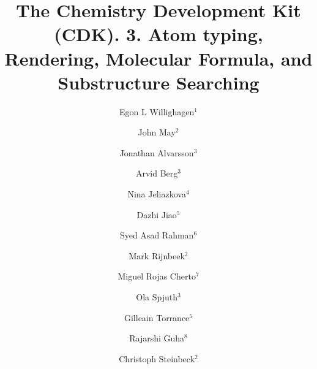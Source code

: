 \documentclass[10pt]{bmc_article}
\newenvironment{bmcformat}{\begin{raggedright}\baselineskip20pt\sloppy\setboolean{publ}{false}}{\end{raggedright}\baselineskip20pt\sloppy}
\begin{document}
\begin{bmcformat}

\title{The Chemistry Development Kit (CDK). 3. Atom typing, Rendering, Molecular Formula, and Substructure Searching}
 
\author{
  Egon L Willighagen$^{1}$%
\and
  John May$^2$%
\and
  Jonathan Alvarsson$^3$%
\and
  Arvid Berg$^3$%
\and
  Nina Jeliazkova$^4$%
\and
  Dazhi Jiao$^5$%
\and
  Syed Asad Rahman$^6$%
\and
  Mark Rijnbeek$^2$%
\and
  Miguel Rojas Cherto$^7$%
\and
  Ola Spjuth$^3$%
\and
  Gilleain Torrance$^5$%
\and
  Rajarshi Guha$^{8}$%
\and
  Christoph Steinbeck$^{2}$%
}
     
\address{
    \iid(1)Department of Bioinformatics - BiGCaT, Maastricht University, Maastricht, NL-6200 MD, The Netherlands \\
    \iid(2)Chemoinformatics and Metabolism team, European Bioinformatics Institute, Hinxton, UK, \\
    \iid(3)Department of Pharmaceutical Biosciences, Uppsala University, 751 24 Uppsala, Sweden \\
    \iid(4)Ideaconsult Ltd, A. Kanchev 4, Sofia 1000, Bulgaria \\
    \iid(5)Example Ltd., Glasgow, UK \\
    \iid(6)Example Ltd., Glasgow, UK \\
    \iid(7)Division of Analytical Biosciences, Leiden/Amsterdam Center for Drug Research, Leiden, The Netherlands \\
    \iid(8)NIH Center for Translational Therapeutics, 9800 Medical Center Drive, Rockville, MD 20878, USA
}

\maketitle



\end{bmcformat}
\end{document}
